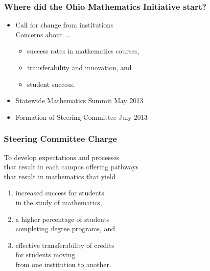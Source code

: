 \documentclass[14pt]{beamer}
\newcounter{a}
\newcounter{b}
\begin{document}
\begin{frame}%
  \frametitle{Where did the Ohio Mathematics Initiative start?}

  \begin{itemize}
  \item Call for change from institutions \\[0.5ex]
    Concerns about \ldots
    \begin{itemize}
      \item success rates in mathematics courses,
      \item transferability and innovation, \textcolor{dark}{and}
      \item student success.
    \end{itemize}
  \item Statewide Mathematics Summit \hfill\textcolor{dark}{May 2013}
  \item Formation of Steering Committee \hfill\textcolor{dark}{July 2013}
  \end{itemize}
\end{frame}

\begin{frame}
  \frametitle{Steering Committee Charge}
  
  To develop expectations and processes \\\quad that result in each campus offering pathways \\\quad that result in mathematics that yield
  \begin{enumerate}
    \item increased success for students \\\quad in the study of mathematics,
    \item a higher percentage of students \\\quad completing degree     
      programs, \textcolor{dark}{and}
    \item effective transferability of credits \\\quad for students moving 
      \\\quad\quad from one institution to another.
  \end{enumerate}
  
\end{frame}
\end{document}
